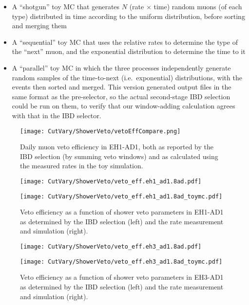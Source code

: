 \documentclass[../thesis.tex]{subfiles}
\begin{document}
\begin{itemize}
\item A ``shotgun'' toy MC that generates $N$ (rate $\times$ time) random muons (of each type) distributed in time according to the uniform distribution, before sorting and merging them
\item A ``sequential'' toy MC that uses the relative rates to determine the type of the ``next'' muon, and the exponential distribution to determine the time to it
\item A ``parallel'' toy MC in which the three processes independently generate random samples of the time-to-next (i.e.\ exponential) distributions, with the events then sorted and merged. This version generated output files in the same format as the pre-selector, so the actual second-stage IBD selection could be run on them, to verify that our window-adding calculation agrees with that in the IBD selector.
\end{itemize}

\begin{figure}[ht]
  \texttt{[image: CutVary/ShowerVeto/vetoEffCompare.png]}
  \caption{Daily muon veto efficiency in EH1-AD1, both as reported by the IBD selection (by summing veto windows) and as calculated using the measured rates in the toy simulation.}
  \label{fig:cutVaryVetoEffCompare}
\end{figure}

\begin{figure}[ht]
  \begin{minipage}{0.5\linewidth}%
    \texttt{[image: CutVary/ShowerVeto/veto\_eff.eh1\_ad1.8ad.pdf]}%
  \end{minipage}%
  \begin{minipage}{0.5\linewidth}%
  \texttt{[image: CutVary/ShowerVeto/veto\_eff.eh1\_ad1.8ad\_toymc.pdf]}%
  \end{minipage}%
  \caption{Veto efficiency as a function of shower veto parameters in EH1-AD1 as determined by the IBD selection (left) and the rate measurement and simulation (right).}
  \label{fig:cutVaryVetoEff2dNear}
\end{figure}

\begin{figure}[ht]
  \begin{minipage}{0.5\linewidth}%
    \texttt{[image: CutVary/ShowerVeto/veto\_eff.eh3\_ad1.8ad.pdf]}%
  \end{minipage}%
  \begin{minipage}{0.5\linewidth}%
    \texttt{[image: CutVary/ShowerVeto/veto\_eff.eh3\_ad1.8ad\_toymc.pdf]}%
  \end{minipage}%
  \caption{Veto efficiency as a function of shower veto parameters in EH3-AD1 as determined by the IBD selection (left) and the rate measurement and simulation (right).}
  \label{fig:cutVaryVetoEff2dFar}
\end{figure}
\end{document}
